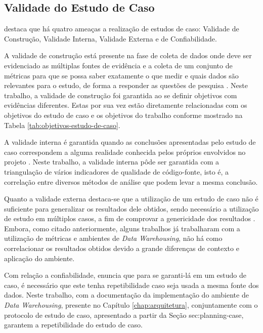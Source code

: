 \subsection{Validade do Estudo de Caso}

 destaca que há quatro ameaças a realização de estudos de caso: Validade de Construção, Validade Interna, Validade Externa e de Confiabilidade.

A validade de construção está presente na fase de coleta de dados onde deve ser evidenciado as múltiplas fontes de evidência e a coleta de um conjunto de métricas para que se possa saber exatamente o que medir e quais dados são relevantes para o estudo, de forma a responder as questões de pesquisa \cite{yin2011applications}. Neste trabalho, a validade de construção foi garantida ao se definir objetivos com evidências diferentes. Estas por sua vez estão diretamente relacionadas com os objetivos do estudo de caso e os objetivos do trabalho conforme mostrado na Tabela \ref{tab:objetivos-estudo-de-caso}.

A validade interna é garantida quando as conclusões apresentadas pelo estudo de caso correspondem a alguma realidade conhecida pelos próprios envolvidos no projeto \cite{yin2011applications}. Neste trabalho, a validade interna pôde ser garantida com a triangulação de vários indicadores de qualidade de código-fonte, isto é, a correlação entre diversos métodos de análise que podem levar a mesma conclusão. 

Quanto a validade externa destaca-se que a utilização de um estudo de caso não é suficiente para generalizar os resultados dele obtidos, sendo necessário a utilização de estudo em múltiplos casos, a fim de comprovar a genericidade dos resultados \cite{yin2011applications}. Embora, como citado anteriormente, alguns trabalhos já trabalharam com a utilização de métricas e ambientes de \textit{Data Warehousing}, não há como correlacionar os resultados obtidos devido a grande diferenças de contexto e aplicação do ambiente.

Com relação a confiabilidade,  enuncia que para se garanti-lá em um estudo de caso, é necessário que este tenha repetibilidade caso seja usada a mesma fonte dos dados. Neste trabalho, com a documentação da implementação do ambiente de \textit{Data Warehousing}, presente no Capítulo \ref{chap:arquitetura}, conjuntamente com o protocolo de estudo de caso, apresentado a partir da Seção {sec:planning-case}, garantem a repetibilidade do estudo de caso.

